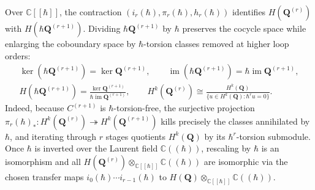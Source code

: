 \documentclass[11pt]{article}
\numberwithin{equation}{section}
\numberwithin{figure}{section}
\numberwithin{table}{section}
\begin{document}
Over $\mathbb C[[\hbar]]$, the contraction $(i_r(\hbar),\pi_r(\hbar),h_r(\hbar))$ identifies $H(\mathbf Q^{(r)})$ with $H(\hbar\mathbf Q^{(r+1)})$. Dividing $\hbar\mathbf Q^{(r+1)}$ by $\hbar$ preserves the cocycle space while enlarging the coboundary space by $\hbar$-torsion classes removed at higher loop orders:
\begin{equation}\label{ch9-rescaling-cohomology}
\begin{gathered}
\ker(\hbar\mathbf Q^{(r+1)})=\ker\mathbf Q^{(r+1)},\qquad
\operatorname{im}(\hbar\mathbf Q^{(r+1)})
=\hbar\operatorname{im}\mathbf Q^{(r+1)},\\
H(\hbar\mathbf Q^{(r+1)})
=\frac{\ker\mathbf Q^{(r+1)}}{\hbar\operatorname{im}\mathbf Q^{(r+1)}},\qquad
H^k(\mathbf Q^{(r)})\cong\frac{H^k(\mathbf Q)}{\{u\in H^k(\mathbf Q):\hbar^ru=0\}}.
\end{gathered}
\end{equation}
Indeed, because $C^{(r+1)}$ is $\hbar$-torsion-free, the surjective projection $\pi_r(\hbar)_*:H^k(\mathbf Q^{(r)})\twoheadrightarrow H^k(\mathbf Q^{(r+1)})$ kills precisely the classes annihilated by $\hbar$, and iterating through $r$ stages quotients $H^k(\mathbf Q)$ by its $\hbar^r$-torsion submodule. Once $\hbar$ is inverted over the Laurent field $\mathbb C((\hbar))$, rescaling by $\hbar$ is an isomorphism and all $H(\mathbf Q^{(r)})\otimes_{\mathbb C[[\hbar]]}\mathbb C((\hbar))$ are isomorphic via the chosen transfer maps $i_0(\hbar)\cdots i_{r-1}(\hbar)$ to $H(\mathbf Q)\otimes_{\mathbb C[[\hbar]]}\mathbb C((\hbar))$.
\end{document}
